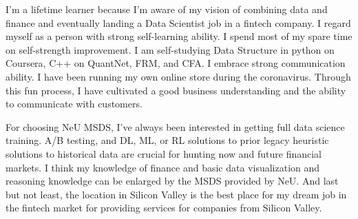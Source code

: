 \documentclass[a4paper,english]{article}
\begin{document}
I'm a lifetime learner because I'm aware of my vision of combining data and finance and eventually landing a Data Scientist job in a fintech company. I regard myself as a person with strong self-learning ability. I spend most of my spare time on self-strength improvement. I am self-studying Data Structure in python on Coursera, C++ on QuantNet, FRM, and CFA. I embrace strong communication ability. I have been running my own online store during the coronavirus. Through this fun process, I have cultivated a good business understanding and the ability to communicate with customers.

For choosing NeU MSDS, I've always been interested in getting full data science training. A/B testing, and DL, ML, or RL solutions to prior legacy heuristic solutions to historical data are crucial for hunting now and future financial markets. I think my knowledge of finance and basic data visualization and reasoning knowledge can be enlarged by the MSDS provided by NeU. And last but not least, the location in Silicon Valley is the best place for my dream job in the fintech market for providing services for companies from Silicon Valley.
\end{document}
